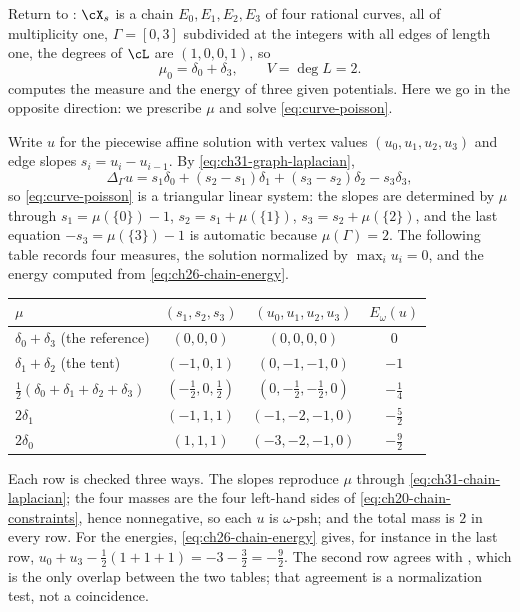\begin{example}
\label{ex:ch31-chain-solve}
Return to : \(\cX_s\) is a chain
\(E_0,E_1,E_2,E_3\) of four rational curves, all of multiplicity one,
\(\Gamma=[0,3]\) subdivided at the integers with all edges of length one,
the degrees of \(\cL\) are \((1,0,0,1)\), so
\[
 \mu_0=\delta_0+\delta_3,\qquad V=\deg L=2 .
\]
 computes the measure and the energy of three
given potentials.  Here we go in the opposite direction: we prescribe
\(\mu\) and solve \eqref{eq:curve-poisson}.

Write \(u\) for the piecewise affine solution with vertex values
\((u_0,u_1,u_2,u_3)\) and edge slopes \(s_i=u_i-u_{i-1}\).  By
\eqref{eq:ch31-graph-laplacian},
\begin{equation}
\label{eq:ch31-chain-laplacian}
 \Delta_\Gamma u
 =s_1\delta_0+(s_2-s_1)\delta_1+(s_3-s_2)\delta_2-s_3\delta_3 ,
\end{equation}
so \eqref{eq:curve-poisson} is a triangular linear system: the slopes are
determined by \(\mu\) through
\(s_1=\mu(\{0\})-1\), \(s_2=s_1+\mu(\{1\})\), \(s_3=s_2+\mu(\{2\})\), and
the last equation \(-s_3=\mu(\{3\})-1\) is automatic because
\(\mu(\Gamma)=2\).  The following table records four measures, the solution
normalized by \(\max_iu_i=0\), and the energy computed from
\eqref{eq:ch26-chain-energy}.
\begin{center}
\small
\begin{tabular}{l|c|c|c}
\toprule
\(\mu\)&\((s_1,s_2,s_3)\)&\((u_0,u_1,u_2,u_3)\)&\(E_\omega(u)\)\\
\midrule
\(\delta_0+\delta_3\) (the reference)&\((0,0,0)\)&\((0,0,0,0)\)&\(0\)\\
\(\delta_1+\delta_2\) (the tent)&\((-1,0,1)\)&\((0,-1,-1,0)\)&\(-1\)\\
\(\tfrac12(\delta_0+\delta_1+\delta_2+\delta_3)\)
 &\((-\tfrac12,0,\tfrac12)\)&\((0,-\tfrac12,-\tfrac12,0)\)
 &\(-\tfrac14\)\\
\(2\delta_1\)&\((-1,1,1)\)&\((-1,-2,-1,0)\)&\(-\tfrac52\)\\
\(2\delta_0\)&\((1,1,1)\)&\((-3,-2,-1,0)\)&\(-\tfrac92\)\\
\bottomrule
\end{tabular}
\end{center}
Each row is checked three ways.  The slopes reproduce \(\mu\) through
\eqref{eq:ch31-chain-laplacian}; the four masses are the four left-hand
sides of \eqref{eq:ch20-chain-constraints}, hence nonnegative, so each
\(u\) is \(\omega\)-psh; and the total mass is \(2\) in every row.  For the
energies, \eqref{eq:ch26-chain-energy} gives, for instance in the last row,
\(u_0+u_3-\tfrac12(1+1+1)=-3-\tfrac32=-\tfrac92\).  The second row agrees
with , which is the only overlap between the two
tables; that agreement is a normalization test, not a coincidence.


\end{example}
